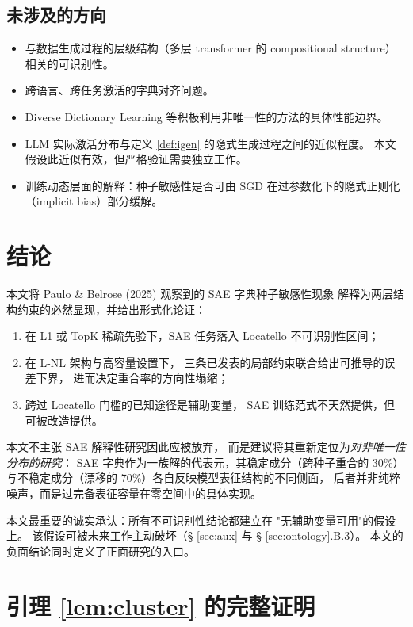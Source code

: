 \documentclass[11pt,a4paper]{article}
\theoremstyle{remark}
\begin{document}
\subsection{未涉及的方向}

\begin{itemize}[leftmargin=*,itemsep=2pt]
\item 与数据生成过程的层级结构（多层 transformer 的 compositional structure）
相关的可识别性。
\item 跨语言、跨任务激活的字典对齐问题。
\item Diverse Dictionary Learning \cite{zheng2026} 等积极利用非唯一性的方法的具体性能边界。
\item LLM 实际激活分布与定义 \ref{def:igen} 的隐式生成过程之间的近似程度。
本文假设此近似有效，但严格验证需要独立工作。
\item 训练动态层面的解释：种子敏感性是否可由 SGD 在过参数化下的隐式正则化
（implicit bias）部分缓解。
\end{itemize}

\section{结论}\label{sec:conclusion}

本文将 Paulo \& Belrose (2025) 观察到的 SAE 字典种子敏感性现象
解释为两层结构约束的必然显现，并给出形式化论证：
\begin{enumerate}[leftmargin=*,itemsep=2pt]
\item 在 L1 或 TopK 稀疏先验下，SAE 任务落入 Locatello 不可识别性区间；
\item 在 L-NL 架构与高容量设置下，
三条已发表的局部约束联合给出可推导的误差下界，
进而决定重合率的方向性塌缩；
\item 跨过 Locatello 门槛的已知途径是辅助变量，
SAE 训练范式不天然提供，但可被改造提供。
\end{enumerate}

本文不主张 SAE 解释性研究因此应被放弃，
而是建议将其重新定位为\emph{对非唯一性分布的研究}：
SAE 字典作为一族解的代表元，其稳定成分（跨种子重合的 30\%）
与不稳定成分（漂移的 70\%）各自反映模型表征结构的不同侧面，
后者并非纯粹噪声，而是过完备表征容量在零空间中的具体实现。

本文最重要的诚实承认：所有不可识别性结论都建立在
"无辅助变量可用"的假设上。
该假设可被未来工作主动破坏（§ \ref{sec:aux} 与 § \ref{sec:ontology}.B.3）。
本文的负面结论同时定义了正面研究的入口。

\appendix

\section{引理 \ref{lem:cluster} 的完整证明}\label{app:proof}
\end{document}
